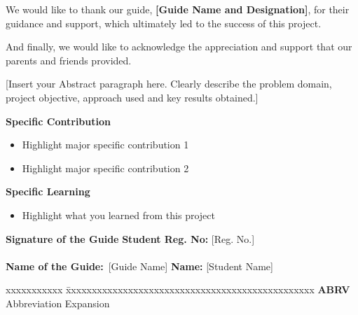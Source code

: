 \documentclass[a4paper, 12pt, oneside]{sastra_cse}
\begin{document}
\par We would like to thank our guide, \textbf{[Guide Name and Designation]}, for their guidance and support, which ultimately led to the success of this project.

\par And finally, we would like to acknowledge the appreciation and support that our parents and friends provided.

	\pagebreak
	
	\abstract
	
	\vspace*{12pt}
	
[Insert your Abstract paragraph here. Clearly describe the problem domain, project objective, approach used and key results obtained.]
	
	\noindent \textbf{Specific Contribution}
	\begin{itemize}
		\item Highlight major specific contribution 1
		\item Highlight major specific contribution 2
	\end{itemize}
	\noindent \textbf{Specific Learning}
	\begin{itemize}
		\item Highlight what you learned from this project
	\end{itemize}
	
	\vspace*{12pt}
	
	\noindent \textbf{Signature of the Guide} \hfill \textbf{Student Reg. No:} [Reg. No.]\\
		\\
\noindent \textbf{Name of the Guide:}~[Guide Name] \hfill \textbf{Name:} [Student Name]
\pagebreak
	
		\tableofcontents
	\thispagestyle{empty}
	
	\listoffigures
	\listoftables
	
	
	\abbreviations
	
	\noindent 
	\begin{tabbing}
		xxxxxxxxxxx \= xxxxxxxxxxxxxxxxxxxxxxxxxxxxxxxxxxxxxxxxxxxxxxxx \kill
		\textbf{ABRV}   \> Abbreviation Expansion \\
	\end{tabbing}
	
\end{document}

